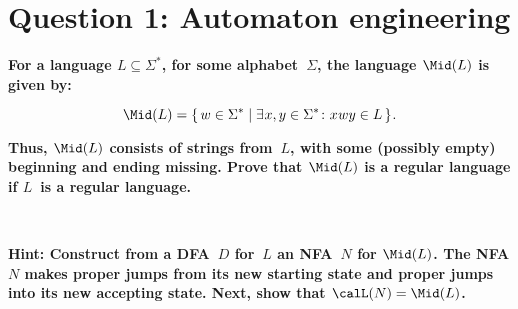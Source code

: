 \section*{Question 1: Automaton engineering}

\textbf{For a language $L \subseteq \Sigma^\ast$, for some alphabet~$\Sigma$, the language $\Mid(L)$ is given by:}

\begin{displaymath}
  \Mid(L) =
  \lbrace \, w \in \Sigma^\ast \mid
  \exists \mkern1mu x,y \in \Sigma^\ast \colon
  x \mkern0.5mu wy \in L
  \, \rbrace \mkern1mu .
\end{displaymath}

\textbf{Thus, $\Mid(L)$ consists of strings from~$L$, with some (possibly empty) beginning and ending missing. Prove that $\Mid(L)$ is a regular language if $L$~is a regular language.}

\\\medskip

\textbf{Hint: Construct from a DFA~$D$ for~$L$ an NFA~$N$ for $\Mid(L)$. The NFA $N$ makes proper jumps from its new starting state and proper jumps into its new accepting state. Next, show that $\calL(N) = \Mid(L)$.}


